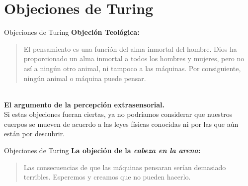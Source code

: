 \documentclass{beamer}
\begin{document}
\section{Objeciones de Turing}
\begin{frame}{Objeciones de Turing}
\textbf{Objeción Teológica:}
\begin{quote}\small El pensamiento es una función del alma inmortal del hombre. Dios ha proporcionado un alma inmortal a todos los hombres y mujeres, pero no así a ningún otro animal, ni tampoco a las máquinas. Por consiguiente, ningún animal o máquina puede pensar.\end{quote}\\
\vspace{8mm}
\textbf{El argumento de la percepción extrasensorial.}\\
Si estas objeciones fueran ciertas, ya no podríamos considerar que nuestros cuerpos se mueven de acuerdo a las leyes físicas conocidas ni por las que aún están por descubrir.
\end{frame}

\begin{frame}{Objeciones de Turing}
\textbf{La objeción de la \emph{cabeza en la arena}:}
\begin{quote}\small Las consecuencias de que las máquinas pensaran serían demasiado terribles. Esperemos y creamos que no pueden hacerlo.\end{quote}
\end{frame}
\end{document}
